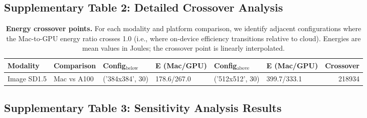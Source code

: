 \documentclass[11pt]{article}
\begin{document}
\clearpage
\subsection{Supplementary Table 2: Detailed Crossover Analysis}

\begin{table}[H]
\centering
\caption{\textbf{Energy crossover points.} For each modality and platform comparison, we identify adjacent configurations where the Mac-to-GPU energy ratio crosses 1.0 (i.e., where on-device efficiency transitions relative to cloud). Energies are mean values in Joules; the crossover point is linearly interpolated.}
\small
\begin{tabular}{llllllr}
\toprule
Modality & Comparison & Config$_{\text{below}}$ & E (Mac/GPU) & Config$_{\text{above}}$ & E (Mac/GPU) & Crossover \\
\midrule
Image SD1.5 & Mac vs A100 & ('384x384', 30) & 178.6/267.0 & ('512x512', 30) & 399.7/333.1 & 218934 \\

\bottomrule
\end{tabular}
\label{tab:crossover}
\end{table}

\subsection{Supplementary Table 3: Sensitivity Analysis Results}
\end{document}
